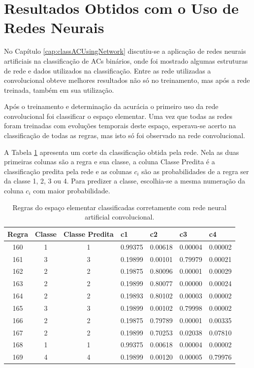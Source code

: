 \documentclass[12pt,a4paper]{report}
\begin{document}
	
	\section{Resultados Obtidos com o Uso de Redes Neurais}
	\label{ResultadosObtidoUsoRedesNeurais}
	
	No Capítulo \ref{cap:classACUsingNetwork} discutiu-se a aplicação de redes neurais artificiais na classificação de ACs binários, onde foi mostrado algumas estruturas de rede e dados utilizados na classificação. Entre as rede utilizadas a convolucional obteve melhores resultados não só no treinamento, mas após a rede treinada, também em sua utilização.
	
	Após o treinamento e determinação da acurácia o primeiro uso da rede convolucional foi classificar o espaço elementar. Uma vez que todas as redes foram treinadas com evoluções temporais deste espaço, esperava-se acerto na classificação de todas as regras, mas isto só foi observado na rede convolucional.  
	
	A Tabela \ref{table:regrasClassificadasCNN} apresenta um corte da classificação obtida pela rede. Nela as duas primeiras colunas são a regra e sua classe, a coluna Classe Predita é a classificação predita pela rede e as colunas $c_i$ são as probabilidades de a regra ser da classe 1, 2, 3 ou 4. Para predizer a classe, escolhia-se a mesma numeração da coluna $c_i$ com maior probabilidade.
	
	\begin{table}[H]
		\centering
		\caption{Regras do espaço elementar classificadas corretamente com rede neural artificial convolucional.
		}
		\label{table:regrasClassificadasCNN}
		\vskip 0.3cm
		\begin{tabular}{ c c c l l l l }
			\hline
			Regra & Classe & Classe Predita & c1 & c2 & c3 & c4 \\ \hline
			160 & 1 & 1 & 0.99375 & 0.00618 & 0.00004 & 0.00002 \\ \hline
			161 & 3 & 3 & 0.19899 & 0.00101 & 0.79979 & 0.00021 \\ \hline
			162 & 2 & 2 & 0.19875 & 0.80096 & 0.00001 & 0.00029 \\ \hline
			163 & 2 & 2 & 0.19899 & 0.80077 & 0.00000 & 0.00024 \\ \hline
			164 & 2 & 2 & 0.19893 & 0.80102 & 0.00003 & 0.00002 \\ \hline
			165 & 3 & 3 & 0.19899 & 0.00102 & 0.79998 & 0.00002 \\ \hline
			166 & 2 & 2 & 0.19875 & 0.79789 & 0.00001 & 0.00335 \\ \hline
			167 & 2 & 2 & 0.19899 & 0.70253 & 0.02038 & 0.07810 \\ \hline
			168 & 1 & 1 & 0.99375 & 0.00618 & 0.00004 & 0.00002 \\ \hline
			169 & 4 & 4 & 0.19899 & 0.00120 & 0.00005 & 0.79976 \\ \hline
		\end{tabular}
	\end{table}
	
\end{document}
